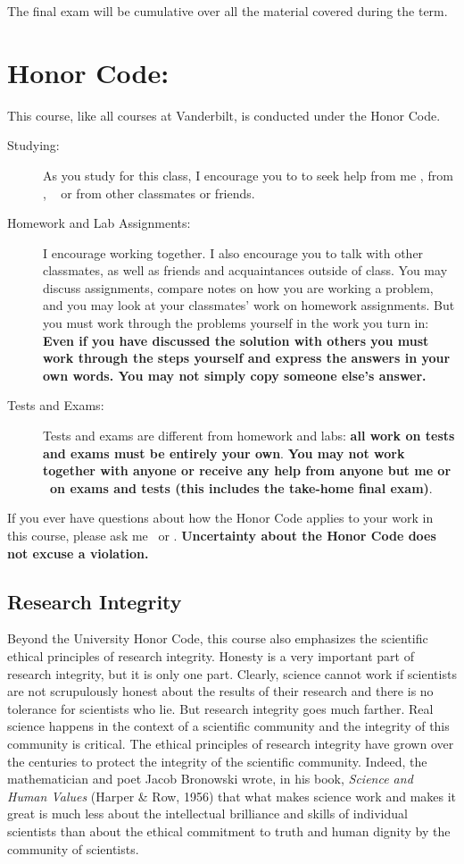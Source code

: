 \documentclass[11pt,twoside]{jgsyllabus}\usepackage[]{graphicx}\usepackage[]{color}
\begin{document}
The final exam will be cumulative over all the material covered during the term.

\section{Honor Code:}
This course, like all courses at Vanderbilt, is conducted under the Honor Code.
\begin{description}
\item[Studying:] As you study for this class, I encourage you to to seek help from me%
\ifTA
, from \TaTitle,
\else
\
\fi
or from other classmates or friends.
%
\item[Homework and Lab Assignments:] I encourage working together.
I also encourage you to talk with other classmates, as well as friends and
acquaintances outside of class. You may discuss assignments, compare notes on
how you are working a problem, and you may look at your classmates' work on
homework assignments.
But you must work through the problems yourself in the work you turn in:
\textbf{Even if you have discussed the solution with others you must
work through the steps yourself and express the answers in your own words.
You may not simply copy someone else's answer.}
%
\item[Tests and Exams:] Tests and exams are different from homework and labs:
\textbf{all work on tests and exams must be entirely your own}.
\textbf{You may not work together with anyone or receive any help from anyone
but me%
\ifTA
or \TaTitle
\fi
\ on exams and tests (this includes the take-home final exam)}.
\end{description}

If you ever
have questions about how the Honor Code applies to your work
in this course, please ask me%
\ifTA
\ or \TaTitle
\fi
.
\textbf{Uncertainty about the Honor Code does not excuse a violation.}

\subsection{Research Integrity}

Beyond the University Honor Code, this course also emphasizes the scientific
ethical principles of research integrity.
Honesty is a very important part of research integrity, but it is only one part.
Clearly, science cannot work if scientists are not scrupulously honest about
the results of their research and there is no tolerance for scientists who
lie. But research integrity goes much farther. Real science happens in the
context of a scientific community and the integrity of this community is
critical. The ethical principles of research
integrity have grown over the centuries to protect the integrity of the
scientific community. Indeed, the mathematician and poet Jacob Bronowski wrote,
in his book, \emph{Science and Human Values\/} (Harper \& Row, 1956) that what makes
science work and makes it great is much less about the intellectual brilliance
and skills of individual scientists than about the ethical commitment to truth
and human dignity by the community of scientists.
\end{document}
